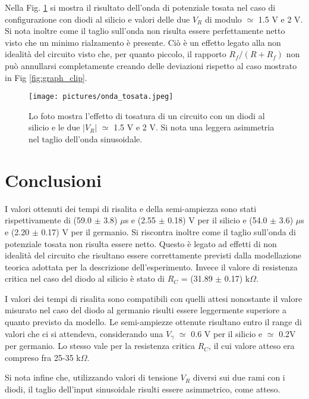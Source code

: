 \documentclass[a4paper,11pt]{article}
\begin{document}
	Nella Fig. \ref{fig:onda_tosata} si mostra il risultato dell'onda di potenziale tosata nel caso di configurazione con diodi al silicio e valori delle due $V_R$ di modulo $\simeq$ 1.5 V e 2 V. Si nota inoltre come il taglio sull'onda non risulta essere perfettamente netto visto che un minimo rialzamento è presente. Ciò è un effetto legato alla non idealità del circuito visto che, per quanto piccolo, il rapporto $R_f/(R+R_f)$ non può annullarsi completamente creando delle deviazioni rispetto al caso mostrato in Fig \ref{fig:graph_clip}.
	
	\begin{figure}
		\centering  
		\texttt{[image: pictures/onda\_tosata.jpeg]}
		\caption{Lo foto mostra l'effetto di tosatura di un circuito con un diodi al silicio e le due $|V_R|$ $\simeq$ 1.5 V e 2 V. Si nota una leggera asimmetria nel taglio dell'onda sinusoidale.}
		\label{fig:onda_tosata}
	\end{figure}
	
	
	
	\section{Conclusioni}
	
	I valori ottenuti dei tempi di risalita e della semi-ampiezza sono stati rispettivamente di (59.0 $\pm$ 3.8) $\mu$s e (2.55 $\pm$ 0.18) V per il silicio e (54.0 $\pm$ 3.6) $\mu$s e (2.20 $\pm$ 0.17) V per il germanio. Si riscontra inoltre come il taglio sull'onda di potenziale tosata non risulta essere netto. Questo è legato ad effetti di non idealità del circuito che risultano essere correttamente previsti dalla modellazione teorica adottata per la descrizione dell'esperimento. Invece il valore di resistenza critica nel caso del diodo al silicio è stato di $R_{C}$ = (31.89 $\pm$ 0.17) k$\Omega$. 
	
	I valori dei tempi di risalita sono compatibili con quelli attesi nonostante il valore misurato nel caso del diodo al germanio risulti essere leggermente superiore a quanto previsto da modello.
	Le semi-ampiezze ottenute risultano entro il range di valori che ci si attendeva, considerando una $V_\gamma$ $\simeq$ 0.6 V per il silicio e $\simeq$ 0.2V per germanio. Lo stesso vale per la resistenza critica $R_C$, il cui valore atteso era compreso fra 25-35 k$\Omega$.
	
	Si nota infine che, utilizzando valori di tensione $V_R$ diversi sui due rami con i diodi, il taglio dell'input sinusoidale risulti essere asimmetrico, come atteso.
	
	\medskip
	
	\printbibliography
	
\end{document}

